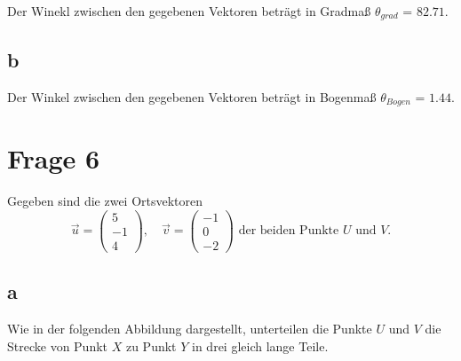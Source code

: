 Der Winekl zwischen den gegebenen Vektoren beträgt in Gradmaß $\theta_{grad}$ = $82.71$.

\subsection{b}

Der Winkel zwischen den gegebenen Vektoren beträgt in Bogenmaß $\theta_{Bogen}$ = $1.44$.

\section{Frage 6}

Gegeben sind die zwei Ortsvektoren
\[
    \vec{u} = \begin{pmatrix}
        5 \\ -1 \\ 4
    \end{pmatrix}, \quad \vec{v} = \begin{pmatrix}
        -1 \\ 0 \\ -2
    \end{pmatrix} \text{ der beiden Punkte } U \text{ und } V\text{.}
\]

\subsection{a}

Wie in der folgenden Abbildung dargestellt, unterteilen die Punkte $U$ und $V$ die Strecke von Punkt $X$ zu Punkt $Y$ in drei gleich lange Teile.

\begin{center}
\end{center}

